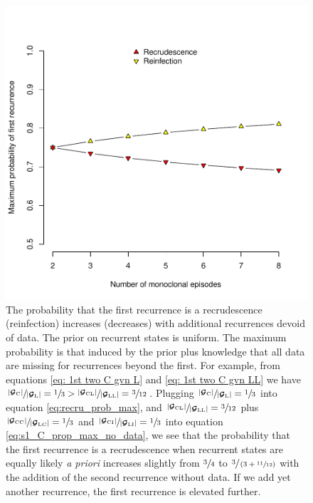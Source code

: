 \documentclass{article}
\begin{document}
\begin{figure}
    \centering
    \includegraphics[width=0.8\linewidth]{figures/monoclonal.pdf}
    \caption{The probability that the first recurrence is a recrudescence (reinfection) increases (decreases) with additional recurrences devoid of data. The prior on recurrent states is uniform. The maximum probability is that induced by the prior plus knowledge that all data are missing for recurrences beyond the first. For example, from equations \eqref{eq: 1st two C gvn L} and \eqref{eq: 1st two C gvn LL} we have $\sfrac{|\bm{\mathcal{G}}_{\mathrm{C}}|}{|\bm{\mathcal{G}}_{\mathrm{L}}|} = \sfrac{1}{3} > \sfrac{|\bm{\mathcal{G}}_{\mathrm{C}\mathrm{L}}|}{|\bm{\mathcal{G}}_{\mathrm{L}\mathrm{L}}|} = \sfrac{3}{12}$. Plugging $\sfrac{|\bm{\mathcal{G}}_{\mathrm{C}}|}{|\bm{\mathcal{G}}_{\mathrm{L}}|} = \sfrac{1}{3}$ into equation \eqref{eq:recru_prob_max}, and $\sfrac{|\bm{\mathcal{G}}_{\mathrm{C}\mathrm{L}}|}{|\bm{\mathcal{G}}_{\mathrm{L}\mathrm{L}}|} = \sfrac{3}{12}$ plus $\sfrac{|\bm{\mathcal{G}}_{\mathrm{C}\mathrm{C}}|}{|\bm{\mathcal{G}}_{\mathrm{L}\mathrm{C}}|} = \sfrac{1}{3}$ and $\sfrac{|\bm{\mathcal{G}}_{\mathrm{C}\mathrm{I}}|}{|\bm{\mathcal{G}}_{\mathrm{L}\mathrm{I}}|} = \sfrac{1}{3}$ into equation \eqref{eq:s1_C_prop_max_no_data}, we see that the probability that the first recurrence is a recrudescence when recurrent states are equally likely \textit{a priori} increases slightly from $\sfrac{3}{4}$ to $\sfrac{3}{\left(3 + \sfrac{11}{12}\right)}$ with the addition of the second recurrence without data. If we add yet another recurrence, the first recurrence is elevated further.}
    \label{fig:monoclonal_recurrences}
\end{figure}
\end{document}
